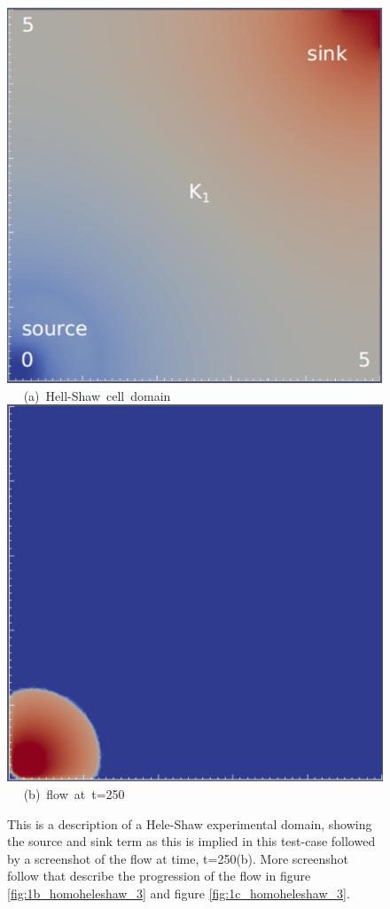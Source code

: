 \begin{figure}[ht] 
\vbox{
\hbox{\hspace{2.5cm}
\includegraphics[width=.6\textwidth]{./Pics1/Saffman_homogeneous_MR3/saffman_homo_fixed_1.pdf} 
}
\vspace{0.0cm}
\hbox{\hspace{4.0cm} (a) Hell-Shaw cell domain   
}
\vspace{0.25cm}
\hbox{\hspace{2.5cm}
\includegraphics[width=.6\textwidth]{./Pics1/Saffman_homogeneous_MR3/saffman_homo_fixed_250.pdf}
}
\vspace{0.0cm}
\hbox{\hspace{5.0cm} (b) flow at t=250  
}
}     
\caption{This is a description of a Hele-Shaw experimental domain, showing the source and sink term as this is implied in this test-case followed by a screenshot of the flow at time, t=250(b). More screenshot follow that describe the progression of the flow in figure \ref{fig:1b_homoheleshaw_3} and figure \ref{fig:1c_homoheleshaw_3}.}
\label{fig:1a_homoheleshaw_3}
\end{figure}
\clearpage


